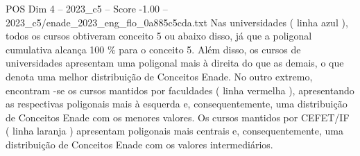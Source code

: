 \begin{textsample}{POS Dim 4 – 2023\_c5 – Score -1.00 – 2023\_c5/enade\_2023\_eng\_flo\_0a885c5cda.txt}
Nas universidades ( linha azul ), todos os cursos obtiveram conceito 5 ou abaixo disso, já que a poligonal cumulativa alcança 100 \% para o conceito 5.
Além disso, os cursos de universidades apresentam uma poligonal mais à direita do que as demais, o que denota uma melhor distribuição de Conceitos Enade.
No outro extremo, encontram -se os cursos mantidos por faculdades ( linha vermelha ), apresentando as respectivas poligonais mais à esquerda e, consequentemente, uma distribuição de Conceitos Enade com os menores valores.
Os cursos mantidos por CEFET/IF ( linha laranja ) apresentam poligonais mais centrais e, consequentemente, uma distribuição de Conceitos Enade com os valores intermediários.

\end{textsample}
